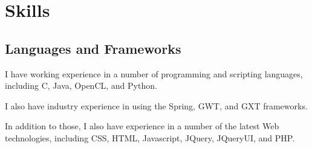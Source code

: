 \documentclass[11pt,a4paper]{article}
\begin{document}
\section*{Skills}

\subsection*{Languages and Frameworks}

I have working experience in a number of programming and scripting languages,
including C, Java, OpenCL, and Python.

I also have industry experience in using the Spring, GWT, and GXT frameworks.

In addition to those, I also have experience in a number of the latest Web
technologies, including CSS, HTML, Javascript, JQuery, JQueryUI, and PHP.

\end{document}
